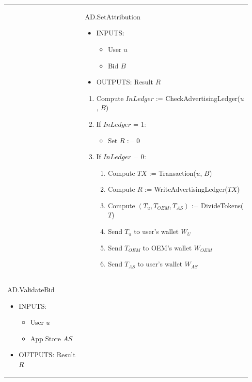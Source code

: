 \begin{table}[H]
\begin{tabular}{|p{}p{}|}
\begin{enumerate}
\begin{enumerate}
\begin{enumerate}
		\end{enumerate}
	\end{enumerate}
\end{enumerate} & \vspace{0.1cm} \textsf{AD.SetAttribution}
\begin{itemize}
	\vspace{-0.3cm}
	\item INPUTS:
	\vspace{-0.4cm}
	\begin{itemize}
		\item User $u$
		\item Bid $B$
	\end{itemize}
	\item OUTPUTS: Result $R$
\end{itemize}
\begin{enumerate}
	\item Compute $InLedger$ := \textsf{CheckAdvertisingLedger}($u$, $B$)
	\item If $InLedger$ = 1:
	\begin{itemize}
		\item Set $R$ := 0
	\end{itemize}
	\item If $InLedger$ = 0:
	\begin{enumerate}
		\item Compute $TX$ := \textsf{Transaction}($u$, $B$)
		\item Compute $R$ := \textsf{WriteAdvertisingLedger}($TX$)
		\item Compute $(T_u, T_{OEM}, T_{AS})$ := \textsf{DivideTokens}($T$)
		\item Send $T_u$ to user's wallet $W_U$
		\item Send $T_{OEM}$ to OEM's wallet $W_{OEM}$
		\item Send $T_{AS}$ to user's wallet $W_{AS}$
	\end{enumerate}
\end{enumerate} \\
\textsf{AD.ValidateBid}
\begin{itemize}
	\vspace{-0.3cm}
	\item INPUTS:
	\vspace{-0.4cm}
	\begin{itemize}
		\item User $u$
		\item App Store $AS$
	\end{itemize}
	\item OUTPUTS: Result $R$

\end{itemize}
\end{tabular}
\end{table}
